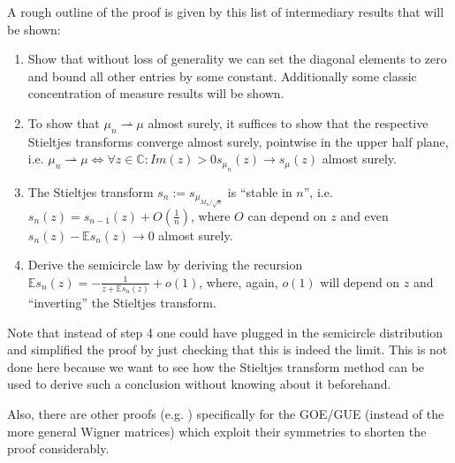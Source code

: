 A rough outline of the proof is given by this list of intermediary results that will be shown:
\begin{enumerate}
	\item Show that without loss of generality we can set the diagonal elements to zero and bound all other entries by some constant. Additionally some classic concentration of measure results will be shown.
	\item To show that $\mu_n\rightharpoonup\mu$ almost surely, it suffices to show that the respective Stieltjes transforms converge almost surely, pointwise in the upper half plane, i.e. $\mu_n\rightharpoonup\mu\Leftrightarrow\forall z\in\mathbb C:Im(z)>0 s_{\mu_n}(z)\rightarrow s_\mu(z)$ almost surely.
	\item The Stieltjes transform $s_n := s_{\mu_{M_n/\sqrt{n}}}$ is ``stable in $n$'', i.e. $s_n(z)=s_{n-1}(z)+O(\frac{1}{n})$, where $O$ can depend on $z$ and even $s_n(z)-\mathbb E s_n(z)\rightarrow 0$ almost surely.
	\item Derive the semicircle law by deriving the recursion $\mathbb E s_n(z)=-\frac{1}{z+\mathbb E s_n(z)}+o(1)$, where, again, $o(1)$ will depend on $z$ and ``inverting'' the Stieltjes transform.
\end{enumerate}
\begin{remark}
	Note that instead of step 4 one could have plugged in the semicircle distribution and simplified the proof by just checking that this is indeed the limit. This is not done here because we want to see how the Stieltjes transform method can be used to derive such a conclusion without knowing about it beforehand.
	
	Also, there are other proofs (e.g. \cite{scGOE}) specifically for the GOE/GUE (instead of the more general Wigner matrices) which exploit their symmetries to shorten the proof considerably.
\end{remark}

